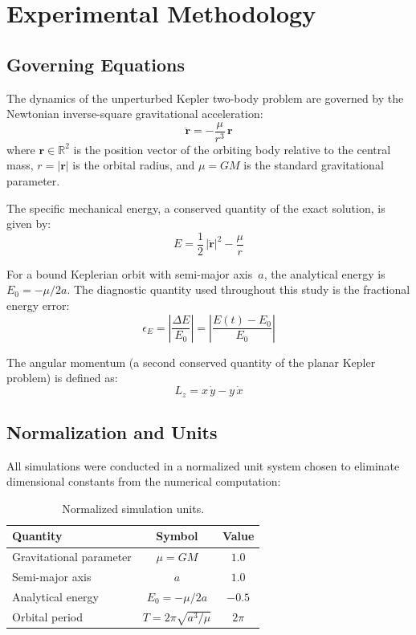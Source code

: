 \documentclass[twocolumn, 10pt]{article}
\begin{document}
\section{Experimental Methodology}

\subsection{Governing Equations}

The dynamics of the unperturbed Kepler two-body problem are governed by the Newtonian inverse-square gravitational acceleration:
\begin{equation}
\ddot{\mathbf{r}} = -\frac{\mu}{r^3}\,\mathbf{r}
\label{eq:newton}
\end{equation}
where $\mathbf{r} \in \mathbb{R}^2$ is the position vector of the orbiting body relative to the central mass, $r = |\mathbf{r}|$ is the orbital radius, and $\mu = GM$ is the standard gravitational parameter.

The specific mechanical energy, a conserved quantity of the exact solution, is given by:
\begin{equation}
E = \frac{1}{2}\,|\dot{\mathbf{r}}|^2 - \frac{\mu}{r}
\label{eq:energy}
\end{equation}

For a bound Keplerian orbit with semi-major axis~$a$, the analytical energy is $E_0 = -\mu / 2a$. The diagnostic quantity used throughout this study is the fractional energy error:
\begin{equation}
\epsilon_E = \left| \frac{\Delta E}{E_0} \right| = \left| \frac{E(t) - E_0}{E_0} \right|
\label{eq:frac_error}
\end{equation}

The angular momentum (a second conserved quantity of the planar Kepler problem) is defined as:
\begin{equation}
L_z = x\,\dot{y} - y\,\dot{x}
\label{eq:angmom}
\end{equation}

\subsection{Normalization and Units}

All simulations were conducted in a normalized unit system chosen to eliminate dimensional constants from the numerical computation:

\begin{table}[H]
\centering
\caption{Normalized simulation units.}
\label{tab:units}
\begin{tabular}{@{}lcc@{}}
\toprule
Quantity & Symbol & Value \\
\midrule
Gravitational parameter & $\mu = GM$ & $1.0$ \\
Semi-major axis & $a$ & $1.0$ \\
Analytical energy & $E_0 = -\mu/2a$ & $-0.5$ \\
Orbital period & $T = 2\pi\sqrt{a^3/\mu}$ & $2\pi$ \\
\bottomrule
\end{tabular}
\end{table}
\end{document}
